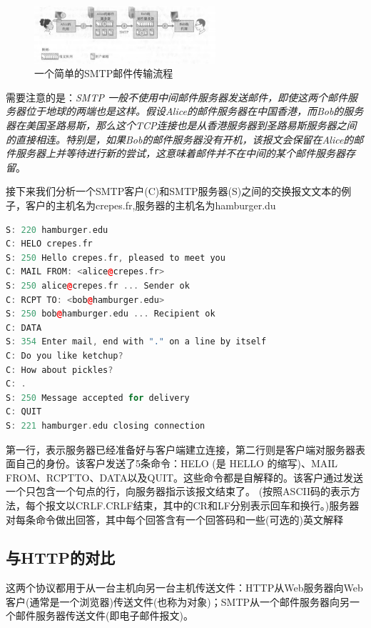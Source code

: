 \begin{figure}[!htbp]
    \centering
    \includegraphics[width=0.6\textwidth]{image/chapter02/SMTP流程.png}
    \caption{一个简单的SMTP邮件传输流程}
\end{figure}

    需要注意的是：\emph{SMTP 一般不使用中间邮件服务器发送邮件，即使这两个邮件服务器位于地球的两端也是这样。假设Alice的邮件服务器在中国香港，而Bob的服务器在美国圣路易斯，那么这个TCP连接也是从香港服务器到圣路易斯服务器之间的直接相连。特别是，如果Bob的邮件服务器没有开机，该报文会保留在Alice的邮件服务器上并等待进行新的尝试，这意味着邮件并不在中间的某个邮件服务器存留}。

    接下来我们分析一个SMTP客户(C)和SMTP服务器(S)之间的交换报文文本的例子，客户的主机名为crepes.fr,服务器的主机名为hamburger.du

\begin{lstlisting}[language=C++]
S: 220 hamburger.edu
C: HELO crepes.fr
S: 250 Hello crepes.fr, pleased to meet you
C: MAIL FROM: <alice@crepes.fr>
S: 250 alice@crepes.fr ... Sender ok
C: RCPT TO: <bob@hamburger.edu>
S: 250 bob@hamburger.edu ... Recipient ok
C: DATA
S: 354 Enter mail, end with "." on a line by itself
C: Do you like ketchup?
C: How about pickles? 
C: .
S: 250 Message accepted for delivery
C: QUIT
S: 221 hamburger.edu closing connection
\end{lstlisting}

    第一行，表示服务器已经准备好与客户端建立连接，第二行则是客户端对服务器表面自己的身份。该客户发送了5条命令：HELO (是 HELLO 的缩写)、MAIL FROM、RCPTTO、DATA以及QUIT。这些命令都是自解释的。该客户通过发送一个只包含一个句点的行，向服务器指示该报文结束了。 (按照ASCII码的表示方法，每个报文以CRLF.CRLF结束，其中的CR和LF分别表示回车和换行。)服务器对每条命令做出回答，其中每个回答含有一个回答码和一些(可选的)英文解释

\subsection{与HTTP的对比}

    这两个协议都用于从一台主机向另一台主机传送文件：HTTP从Web服务器向Web客户(通常是一个浏览器)传送文件(也称为对象)；SMTP从一个邮件服务器向另一个邮件服务器传送文件(即电子邮件报文)。

